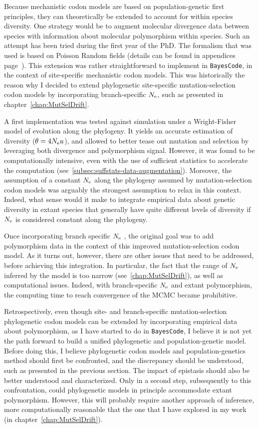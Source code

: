 Because mechanistic codon models are based on population-genetic first principles, they can theoretically be extended to account for within species diversity.
One strategy would be to augment molecular divergence data between species with information about molecular polymorphism within species.
Such an attempt has been tried during the first year of the PhD.
The formalism that was used is based on Poisson Random fields (details can be found in appendices page~\pageref{sec-appendix:PRF}).
This extension was rather straightforward to implement in \texttt{BayesCode}, in the context of site-specific mechanistic codon models.
This was historically the reason why I decided to extend phylogenetic site-specific mutation-selection codon models by incorporating branch-specific $N_{\textrm{e}}$, such as presented in chapter~\ref{chap:MutSelDrift}.

A first implementation was tested against simulation under a Wright-Fisher model of evolution along the phylogeny.
It yields an accurate estimation of diversity ($\theta = 4 N_{\textrm{e}} u$), and allowed to better tease out mutation and selection by leveraging both divergence and polymorphism signal.
However, it was found to be computationally intensive, even with the use of sufficient statistics to accelerate the computation (see~\ref{subsec:suffstats-data-augmentation}).
Moreover, the assumption of a constant $N_{\textrm{e}}$ along the phylogeny assumed by mutation-selection codon models was arguably the strongest assumption to relax in this context.
Indeed, what sense would it make to integrate empirical data about genetic diversity in extant species that generally have quite different levels of diversity if $N_{\textrm{e}}$ is considered constant along the phylogeny.

Once incorporating branch specific $N_{\textrm{e}}$ , the original goal was to add polymorphism data in the context of this improved mutation-selection codon model.
As it turns out, however, there are other issues that need to be addressed, before achieving this integration.
In particular, the fact that the range of $N_{\textrm{e}}$ inferred by the model is too narrow (see~\ref{chap:MutSelDrift}), as well as computational issues.
Indeed, with branch-specific $N_{\textrm{e}}$ and extant polymorphism, the computing time to reach convergence of the \acrshort{MCMC} became prohibitive.

Retrospectively, even though site- and branch-specific mutation-selection phylogenetic codon models can be extended by incorporating empirical data about polymorphism, as I have started to do in \texttt{\texttt{BayesCode}}, I believe it is not yet the path forward to build a unified phylogenetic and population-genetic model.
Before doing this, I believe phylogenetic codon models and population-genetics method should first be confronted, and the discrepancy should be understood, such as presented in the previous section.
The impact of epistasis should also be better understood and characterized.
Only in a second step, subsequently to this confrontation, could phylogenetic models in principle accommodate extant polymorphism.
However, this will probably require another approach of inference, more computationally reasonable that the one that I have explored in my work (in chapter~\ref{chap:MutSelDrift}).


